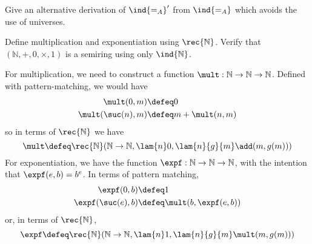 \begin{coqdoccode}
\coqdocemptyline
\coqdocemptyline
\end{coqdoccode}


Give an alternative derivation of $\ind{=_{A}}'$ from
$\ind{=_{A}}$ which avoids the use of universes.


Define multiplication and exponentiation using
$\rec{\mathbb{N}}$.  Verify that $(\mathbb{N}, +, 0, \times, 1)$ is a semiring
using only $\ind{\mathbb{N}}$.


\soln 
For multiplication, we need to construct a function $\mult : \mathbb{N}
\to \mathbb{N} \to \mathbb{N}$.  Defined with pattern-matching, we would have
\begin{align*}
  \mult(0, m) &\defeq 0 \\
  \mult(\suc(n), m) &\defeq m + \mult(n, m)
\end{align*}
so in terms of $\rec{\mathbb{N}}$ we have
\[
  \mult \defeq 
  \rec{\mathbb{N}}(
  \mathbb{N} \to \mathbb{N},
  \lam{n}0,
  \lam{n}{g}{m}\add(m, g(m))
  )
\]
For exponentiation, we have the function $\expf: \mathbb{N} \to \mathbb{N} \to
\mathbb{N}$, with the intention that $\expf(e, b) = b^{e}$.  In terms of pattern
matching,
\begin{align*}
  \expf(0, b) &\defeq 1 \\
  \expf(\suc(e), b) &\defeq \mult(b, \expf(e, b))
\end{align*}
or, in terms of $\rec{\mathbb{N}}$,
\[
  \expf \defeq \rec{\mathbb{N}}(
    \mathbb{N} \to \mathbb{N},
    \lam{n}1,
    \lam{n}{g}{m}\mult(m, g(m))
  )
\]
